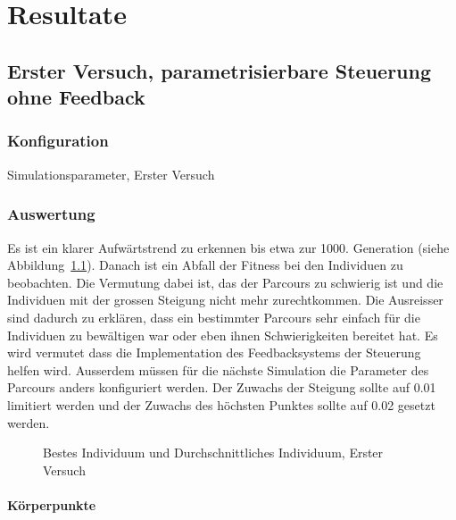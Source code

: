 %
%

\chapter{Resultate\label{chap:Resultate}}

\section{Erster Versuch, parametrisierbare Steuerung ohne Feedback}

  \subsection{Konfiguration}

    \begin{table}[H]
      
      \caption{Simulationsparameter, Erster Versuch}
    \end{table}

  \subsection{Auswertung}

    Es ist ein klarer Aufwärtstrend zu erkennen bis etwa zur 1000. Generation (siehe Abbildung~\ref{fig:graphFirst}).
    Danach ist ein Abfall der Fitness bei den Individuen zu beobachten.
    Die Vermutung dabei ist, das der Parcours zu schwierig ist und die Individuen
    mit der grossen Steigung nicht mehr zurechtkommen.
    Die Ausreisser sind dadurch zu erklären,
    dass ein bestimmter Parcours sehr einfach für die Individuen zu bewältigen war oder eben ihnen Schwierigkeiten bereitet hat.
    Es wird vermutet dass die Implementation des Feedbacksystems der Steuerung helfen wird.
    Ausserdem müssen für die nächste Simulation die Parameter des Parcours anders konfiguriert werden.
    Der Zuwachs der Steigung sollte auf 0.01 limitiert werden und der Zuwachs des höchsten Punktes
    sollte auf 0.02 gesetzt werden.

      \begin{figure}
        
        \caption{Bestes Individuum und Durchschnittliches Individuum, Erster Versuch\label{fig:graphFirst}}
      \end{figure}

    \subsubsection{Körperpunkte\label{subsub:bp}}

